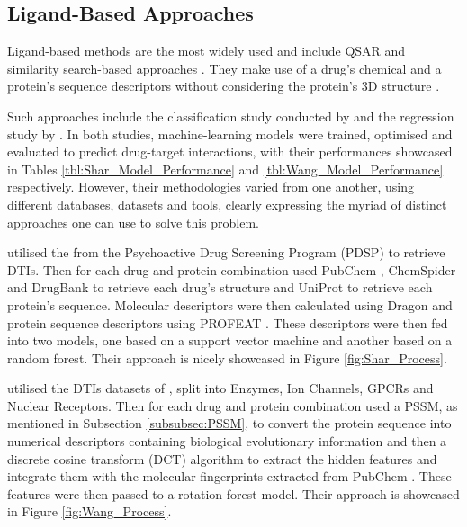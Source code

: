 \subsection{Ligand-Based Approaches}

Ligand-based methods are the most widely used and include QSAR and similarity search-based approaches \citep{Shar2016}. They make use of a 
drug's chemical and a protein's sequence descriptors without considering the protein's 3D structure \citep{Aparoy2012}.

Such approaches include the classification study conducted by \citet{Wang2020} and the regression study by \cite{Shar2016}. In both studies, machine-learning models were trained, optimised and evaluated to predict drug-target interactions, with their performances showcased in Tables \ref{tbl:Shar_Model_Performance} and \ref{tbl:Wang_Model_Performance} respectively. However, their methodologies varied from one another, using different databases, datasets and tools, clearly expressing the myriad of distinct approaches one can use to solve this problem.

\citet{Shar2016} utilised the \citet{Ki_Database} from the Psychoactive Drug Screening Program (PDSP) \citep{Ki_Database_Paper} to retrieve DTIs. Then for each drug and protein combination used PubChem \citep{PubChem}, ChemSpider \citep{ChemSpider} and DrugBank \citep{DrugBank} to retrieve each drug's structure and UniProt \citep{UniProt_Paper} to retrieve each protein's sequence. Molecular descriptors were then calculated using Dragon \citep{DRAGON} and protein sequence descriptors using PROFEAT \citep{PROFEAT}. These descriptors were then fed into two models, one based on a support vector machine and another based on a random forest. Their approach is nicely showcased in Figure \ref{fig:Shar_Process}. 

\citet{Wang2020} utilised the DTIs datasets of \citet{Yamanishi2008}, split into Enzymes, Ion Channels, GPCRs and Nuclear Receptors. Then for each drug and protein combination used a PSSM, as mentioned in Subsection \ref{subsubsec:PSSM}, to convert the protein sequence into numerical descriptors containing biological evolutionary information and then a discrete cosine transform (DCT) algorithm to extract the hidden features and integrate them with the molecular fingerprints extracted from PubChem \citep{PubChem}. These features were then passed to a rotation forest model. Their approach is showcased in Figure \ref{fig:Wang_Process}.



